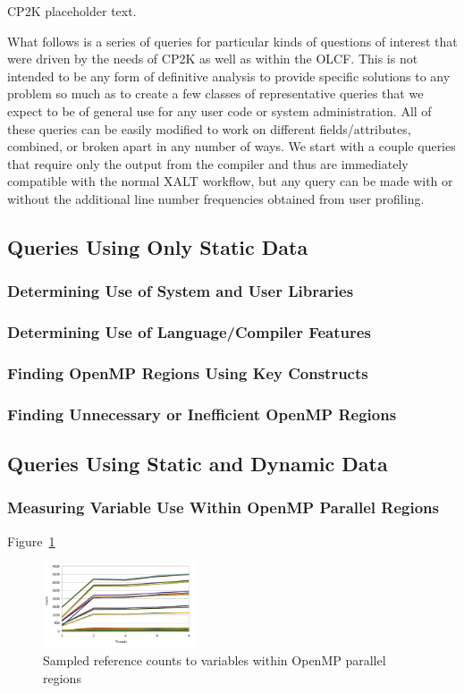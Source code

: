 CP2K placeholder text.

What follows is a series of queries for particular kinds of questions of interest that were driven by the needs of CP2K as well as within the \acs{OLCF}.
This is not intended to be any form of definitive analysis to provide specific solutions to any problem so much as to create a few classes of representative queries that we expect to be of general use for any user code or system administration.
All of these queries can be easily modified to work on different fields/attributes, combined, or broken apart in any number of ways.
We start with a couple queries that require only the output from the compiler and thus are immediately compatible with the normal XALT workflow, but any query can be made with or without the additional line number frequencies obtained from user profiling.

\subsection{Queries Using Only Static Data}
\subsubsection{Determining Use of System and User Libraries}
\subsubsection{Determining Use of Language/Compiler Features}
\subsubsection{Finding OpenMP Regions Using Key Constructs}
\subsubsection{Finding Unnecessary or Inefficient OpenMP Regions}

\subsection{Queries Using Static and Dynamic Data}
\subsubsection{Measuring Variable Use Within OpenMP Parallel Regions}

Figure~\ref{fig:openmp-refcount}

\begin{figure}
\begin{center}
\includegraphics[width=0.4\textwidth]{images/cp2k-omp-inc-full.pdf}
\end{center}
\caption{Sampled reference counts to variables within OpenMP parallel regions}
\label{fig:openmp-refcount}
\end{figure}
